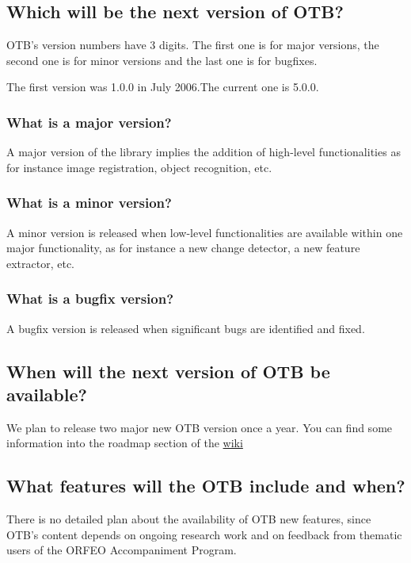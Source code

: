 \subsection{Which will be the next version of OTB?}
OTB's version numbers have 3 digits. The first one is for major
versions, the second one is for minor versions and the last one is for
bugfixes.

The first version was 1.0.0 in July 2006.The current one is 5.0.0.

\subsubsection{What is a major version?}
A major version of the library implies the addition of high-level
functionalities as for instance image registration, object recognition, etc.

\subsubsection{What is a minor version?}
A minor version is released when low-level functionalities are
available within one major functionality, as for instance a new
change detector, a new feature extractor, etc.

\subsubsection{What is a bugfix version?}
A bugfix version is released when significant bugs are identified and fixed.

\subsection{When will the next version of OTB be available?}
We plan to release two major new OTB version once a year. You can find some information into the roadmap section of the \href{http://wiki.orfeo-toolbox.org/index.php/Main_Page}{wiki} 

\subsection{What features will the OTB include and when?}
There is no detailed plan about the availability of OTB new features,
since OTB's content depends on ongoing research work and on feedback
from thematic users of the ORFEO Accompaniment Program.

